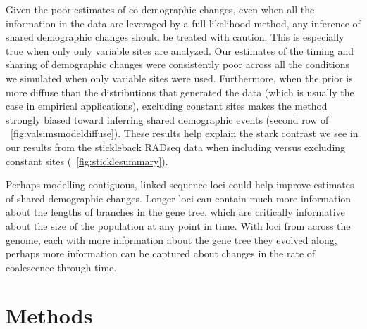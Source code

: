 Given the poor estimates of co-demographic changes, even when all
the information in the data are leveraged by a full-likelihood method, any
inference of shared demographic changes should be treated with caution.
This is especially true when only only variable sites are analyzed.
Our estimates of the timing and sharing of demographic changes were
consistently poor across all the conditions we simulated when only variable
sites were used.
Furthermore, when the prior is more diffuse than the distributions that
generated the data (which is usually the case in empirical applications),
excluding constant sites makes the method strongly biased toward
inferring shared demographic events
(second row of \fig{}~\ref{fig:valsimsmodeldiffuse}).
These results help explain the stark contrast we see in our results from the
stickleback RADseq data when including versus excluding constant sites
(\fig{}~\ref{fig:sticklesummary}).

Perhaps modelling contiguous, linked sequence loci could help
improve estimates of shared demographic changes.
Longer loci can contain much more information about the lengths of branches in
the gene tree, which are critically informative about the size of the
population at any point in time.
With loci from across the genome, each with more information about the gene
tree they evolved along,
perhaps more information can be captured about changes in the rate of
coalescence through time.


\section{Methods}


